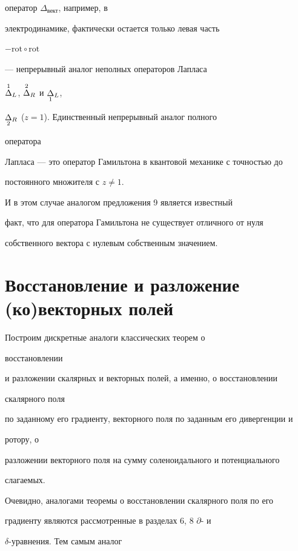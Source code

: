 оператор $\Delta_{\text{вект}}$, например, в  


электродинамике, фактически остается только левая часть 


$-\text{rot}\circ\text{rot}$ 


--- непрерывный аналог неполных операторов Лапласа 


$\overset{1}{\Delta}{}_L$, $\overset{2}{\Delta}{}_R$ и $\underset{1}{\Delta}{}_L$, 


$\underset{2}{\Delta}{}_R$ ($z=1$). Единственный непрерывный аналог полного 


оператора  


Лапласа --- это оператор Гамильтона в квантовой механике с точностью до 


постоянного множителя с $z\ne 1$. 


И в этом случае аналогом предложения 9 является известный  


факт, что для оператора Гамильтона не существует отличного от нуля 


собственного вектора с нулевым собственным значением. 


 


\section{Восстановление и разложение (ко)векторных полей} 


 


Построим дискретные аналоги классических теорем о 


восстановлении  


и разложении скалярных и векторных полей, а именно, о восстановлении 


скалярного поля  


по заданному его градиенту, векторного поля по заданным его дивергенции и 


ротору, о  


разложении векторного поля на сумму соленоидального и потенциального 


слагаемых. 


 


Очевидно, аналогами теоремы о восстановлении скалярного поля по его  


градиенту являются рассмотренные в разделах 6, 8 $\partial$- и 


$\delta$-уравнения. Тем самым аналог 



